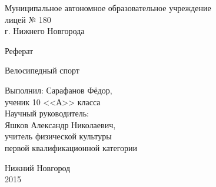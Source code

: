 \begin{titlepage}
\newpage

\begin{center}

Муниципальное автономное образовательное учреждение \\
лицей № 180 \\
г. Нижнего Новгорода \\

\end{center}
 

\vspace{14em}

\begin{center}
\large{Реферат}
\end{center}

 
\begin{center}
Велосипедный спорт
\end{center}

\vspace{4.5em}
 
\begin{flushright}
Выполнил: Сарафанов Фёдор, \\
ученик 10 <<А>> класса \\
Научный руководитель: \\
Яшков Александр Николаевич, \\
учитель физической культуры \\ 
первой квалификационной категории
\end{flushright}
 
\vspace{\fill}

\begin{center}
Нижний Новгород \\
2015
\end{center}

\end{titlepage}